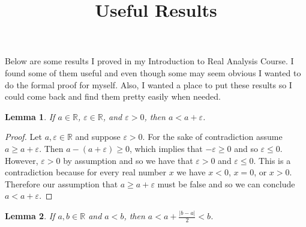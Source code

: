 \documentclass[12pt]{article}
\title{Useful Results}
\newtheorem{lemma}{Lemma}
\begin{document}
\maketitle

Below are some results I proved in my Introduction to Real Analysis Course. I found some of them useful and even though some may seem obvious I wanted to do the formal proof for myself. Also, I wanted a place to put these results so I could come back and find them pretty easily when needed.


\begin{lemma} \label{lemma:a}
If $a \in \mathbb{R}$, $\varepsilon \in \mathbb{R}$, and $\varepsilon > 0$, then $a < a + \varepsilon$.
\end{lemma}

\begin{proof}
Let $a, \varepsilon \in \mathbb{R}$ and suppose $\varepsilon > 0$. For the sake of contradiction assume $a \geq a + \varepsilon$. Then $a - (a + \varepsilon) \geq 0$, which implies that $-\varepsilon \geq 0$ and so $\varepsilon \leq 0$. However, $\varepsilon > 0$ by assumption and so we have that $\varepsilon > 0$ and $\varepsilon \leq 0$. This is a contradiction because for every real number $x$ we have $x < 0$, $x = 0$, or $x > 0$. Therefore our assumption that $a \geq a + \varepsilon$ must be false and so we can conclude $a < a + \varepsilon$. 
\end{proof}

\begin{lemma}
If $a, b \in \mathbb{R}$ and $a < b$, then $\displaystyle a < a + \frac{|b - a|}{2} < b$.
\end{lemma}
\end{document}
